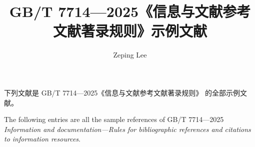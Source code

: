 \documentclass[UTF8]{ctexart}
\title{GB/T 7714—2025《信息与文献\quad 参考文献著录规则》示例文献}
\author{Zeping Lee}
\date{}
\begin{document}
\maketitle

下列文献是 GB/T 7714—2025《信息与文献\quad 参考文献著录规则》
的全部示例文献。

The following entries are all the sample references of GB/T 7714—2025
\emph{Information and documentation—Rules for bibliographic references and
citations to information resources}.

\nocite{*}

\end{document}
